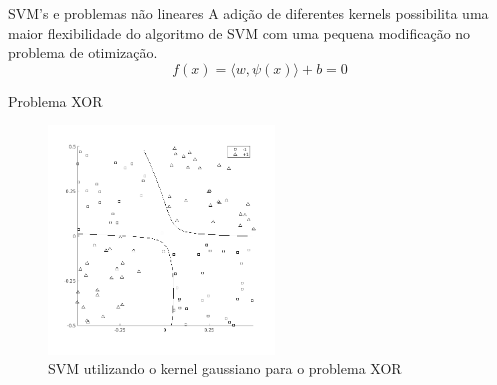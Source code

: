 \documentclass[10pt]{beamer}
\begin{document}
\begin{frame} {SVM's e problemas não lineares}
  A adição de diferentes kernels possibilita uma maior flexibilidade do algoritmo de
  SVM com uma pequena modificação no problema de otimização.
  \begin{equation}
    f(x) = \langle w, \psi(x) \rangle + b = 0
    \nonumber
  \end{equation}
\end{frame}

\begin{frame}{Problema XOR}
  \begin{figure}
    \centering
    \includegraphics[width=6cm]{images/svmXor.png}
    \caption{SVM utilizando o kernel gaussiano para o problema XOR}
  \end{figure}
\end{frame}
\end{document}
